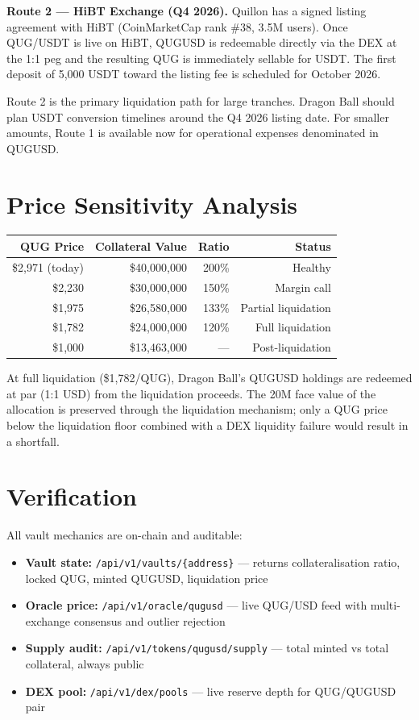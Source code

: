 \documentclass[11pt,a4paper]{article}
\begin{document}
\textbf{Route 2 — HiBT Exchange (Q4 2026).}
Quillon has a signed listing agreement with HiBT (CoinMarketCap rank \#38,
3.5M users). Once QUG/USDT is live on HiBT, QUGUSD is redeemable
directly via the DEX at the 1:1 peg and the resulting QUG is immediately
sellable for USDT. The first deposit of 5,000 USDT toward the listing fee
is scheduled for October 2026.

Route 2 is the primary liquidation path for large tranches. Dragon Ball
should plan USDT conversion timelines around the Q4 2026 listing date.
For smaller amounts, Route 1 is available now for operational expenses
denominated in QUGUSD.

\section{Price Sensitivity Analysis}

\begin{center}
\begin{tabular}{rrrr}
\toprule
\textbf{QUG Price} & \textbf{Collateral Value} & \textbf{Ratio} & \textbf{Status} \\
\midrule
\$2,971 (today)  & \$40,000,000 & 200\% & Healthy \\
\$2,230          & \$30,000,000 & 150\% & Margin call \\
\$1,975          & \$26,580,000 & 133\% & Partial liquidation \\
\$1,782          & \$24,000,000 & 120\% & Full liquidation \\
\$1,000          & \$13,463,000 & ---  & Post-liquidation \\
\bottomrule
\end{tabular}
\end{center}

At full liquidation (\$1,782/QUG), Dragon Ball's QUGUSD holdings are redeemed
at par (1:1 USD) from the liquidation proceeds. The 20M face value of the
allocation is preserved through the liquidation mechanism; only a QUG price
below the liquidation floor combined with a DEX liquidity failure would
result in a shortfall.

\section{Verification}

All vault mechanics are on-chain and auditable:

\begin{itemize}
  \item \textbf{Vault state:} \texttt{/api/v1/vaults/\{address\}} — returns
    collateralisation ratio, locked QUG, minted QUGUSD, liquidation price
  \item \textbf{Oracle price:} \texttt{/api/v1/oracle/qugusd} — live
    QUG/USD feed with multi-exchange consensus and outlier rejection
  \item \textbf{Supply audit:} \texttt{/api/v1/tokens/qugusd/supply} —
    total minted vs total collateral, always public
  \item \textbf{DEX pool:} \texttt{/api/v1/dex/pools} — live reserve
    depth for QUG/QUGUSD pair
\end{itemize}
\end{document}
